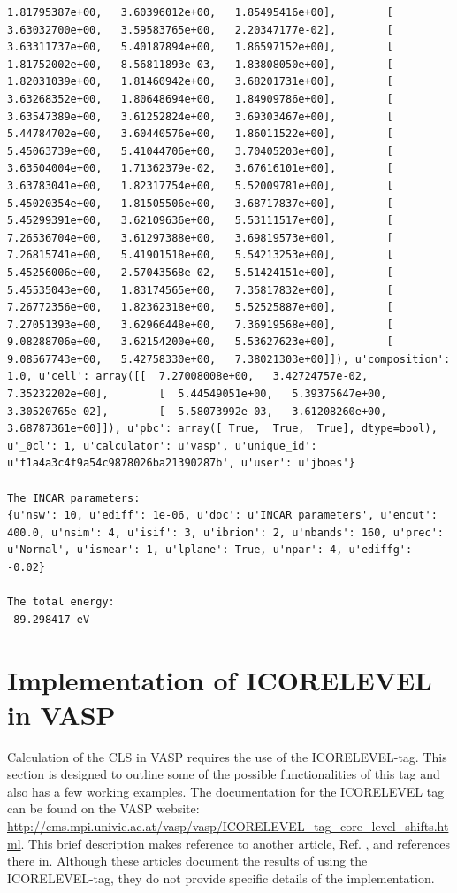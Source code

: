 \documentclass[number, sort&compress, review, 12pt]{elsarticle}
\begin{document}
\begin{verbatim}
1.81795387e+00,   3.60396012e+00,   1.85495416e+00],        [
3.63032700e+00,   3.59583765e+00,   2.20347177e-02],        [
3.63311737e+00,   5.40187894e+00,   1.86597152e+00],        [
1.81752002e+00,   8.56811893e-03,   1.83808050e+00],        [
1.82031039e+00,   1.81460942e+00,   3.68201731e+00],        [
3.63268352e+00,   1.80648694e+00,   1.84909786e+00],        [
3.63547389e+00,   3.61252824e+00,   3.69303467e+00],        [
5.44784702e+00,   3.60440576e+00,   1.86011522e+00],        [
5.45063739e+00,   5.41044706e+00,   3.70405203e+00],        [
3.63504004e+00,   1.71362379e-02,   3.67616101e+00],        [
3.63783041e+00,   1.82317754e+00,   5.52009781e+00],        [
5.45020354e+00,   1.81505506e+00,   3.68717837e+00],        [
5.45299391e+00,   3.62109636e+00,   5.53111517e+00],        [
7.26536704e+00,   3.61297388e+00,   3.69819573e+00],        [
7.26815741e+00,   5.41901518e+00,   5.54213253e+00],        [
5.45256006e+00,   2.57043568e-02,   5.51424151e+00],        [
5.45535043e+00,   1.83174565e+00,   7.35817832e+00],        [
7.26772356e+00,   1.82362318e+00,   5.52525887e+00],        [
7.27051393e+00,   3.62966448e+00,   7.36919568e+00],        [
9.08288706e+00,   3.62154200e+00,   5.53627623e+00],        [
9.08567743e+00,   5.42758330e+00,   7.38021303e+00]]), u'composition':
1.0, u'cell': array([[  7.27008008e+00,   3.42724757e-02,
7.35232202e+00],        [  5.44549051e+00,   5.39375647e+00,
3.30520765e-02],        [  5.58073992e-03,   3.61208260e+00,
3.68787361e+00]]), u'pbc': array([ True,  True,  True], dtype=bool),
u'_0cl': 1, u'calculator': u'vasp', u'unique_id':
u'f1a4a3c4f9a54c9878026ba21390287b', u'user': u'jboes'}

The INCAR parameters:
{u'nsw': 10, u'ediff': 1e-06, u'doc': u'INCAR parameters', u'encut':
400.0, u'nsim': 4, u'isif': 3, u'ibrion': 2, u'nbands': 160, u'prec':
u'Normal', u'ismear': 1, u'lplane': True, u'npar': 4, u'ediffg':
-0.02}

The total energy:
-89.298417 eV
\end{verbatim}

\section{Implementation of ICORELEVEL in VASP}
\label{sec-4}
Calculation of the CLS in VASP requires the use of the ICORELEVEL-tag. This section is designed to outline some of the possible functionalities of this tag and also has a few working examples. The documentation for the ICORELEVEL tag can be found on the VASP website: \url{http://cms.mpi.univie.ac.at/vasp/vasp/ICORELEVEL_tag_core_level_shifts.html}. This brief description makes reference to another article, Ref. , and references there in. Although these articles document the results of using the ICORELEVEL-tag, they do not provide specific details of the implementation.
\end{document}
